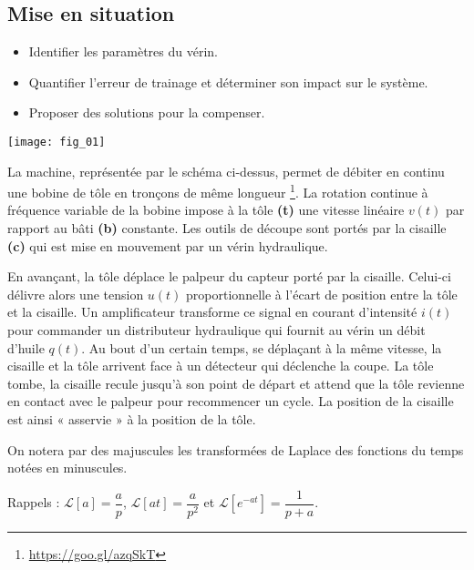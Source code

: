 \ifprof
\else
\begin{multicols}{2}
\fi


\section*{Mise en situation}
\ifprof
\else
\begin{obj}
\begin{itemize}
\item Identifier les paramètres du vérin.
\item Quantifier l'erreur de trainage et déterminer son impact sur le système.
\item Proposer des solutions pour la compenser.
\end{itemize}
\end{obj}
\begin{center}
\texttt{[image: fig\_01]}
\end{center}

La machine, représentée par le schéma ci-dessus, permet de débiter en continu une bobine de tôle en tronçons de même longueur \footnote{
\url{https://goo.gl/azqSkT}}. La rotation continue à fréquence variable de la bobine impose à la tôle \textbf{(t)} une vitesse linéaire $v(t)$ par rapport au bâti \textbf{(b)} constante.
Les outils de découpe sont portés par la cisaille \textbf{(c)} qui est mise en mouvement par un vérin hydraulique.

En avançant, la tôle déplace le palpeur du capteur porté par la cisaille. Celui-ci délivre alors une tension $u(t)$ proportionnelle à l'écart de position entre la tôle et la cisaille. Un amplificateur transforme ce signal en courant d'intensité $i(t)$ pour commander un distributeur hydraulique qui fournit au vérin un débit d'huile $q(t)$. Au bout d'un certain temps, se déplaçant à la même vitesse, la cisaille et la tôle arrivent face à un détecteur qui déclenche la coupe. La tôle tombe, la cisaille recule jusqu'à son point de départ et attend que la tôle revienne en contact avec le palpeur pour recommencer un cycle. La position de la cisaille est ainsi « asservie » à la position de la tôle.

On notera par des majuscules les transformées de Laplace des fonctions du temps notées en minuscules.

Rappels : $\mathcal{L}\left[a\right]=\dfrac{a}{p}$, $\mathcal{L}\left[at\right]=\dfrac{a}{p^2}$ et $\mathcal{L}\left[e^{-at}\right]=\dfrac{1}{p+a}$. 


\end{multicols}
